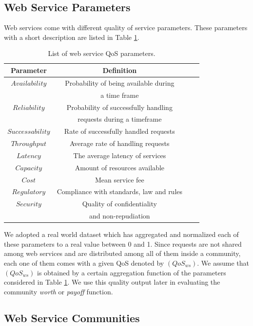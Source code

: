 \subsection{Web Service Parameters}\label{ws_parameters}

Web services come with different quality of service parameters.
These parameters with a short description are listed in Table
\ref{qosws}.

\begin{table}[!t]
\centering
\caption{List of web service QoS parameters.}
\begin{tabular}{|c|c||c|c|}
\hline
\textbf{Parameter} & \textbf{Definition} \\
\hline\hline
$Availability$ & Probability of being available during \\
&a time frame \\
$Reliability$ & Probability of successfully handling \\
&requests during a timeframe\\
$Successability$ & Rate of successfully handled requests \\
$Throughput$ & Average rate of handling requests \\
$Latency$ & The average latency of services\\
$Capacity$ & Amount of resources available\\
$Cost$ & Mean service fee \\
$Regulatory$ & Compliance with standards, law and rules\\
$Security$ & Quality of confidentiality \\
&and non-repudiation\\
\hline
\end{tabular}
\label{qosws}
\end{table}


We adopted a real world dataset \cite{DBLP:conf/smc/Al-MasriM09a}
which has aggregated and normalized each of these parameters to a
real value between 0 and 1. Since requests are not shared among
web services and are distributed among all of them inside a
community, each one of them comes with a given QoS denoted by
$(QoS_{ws})$. We assume that $(QoS_{ws})$ is obtained by a certain
aggregation function of the parameters considered in Table
\ref{qosws}. We use this quality output later in evaluating the
community \emph{worth} or \emph{payoff} function.

\subsection{Web Service Communities}\label{webservice-communities}

